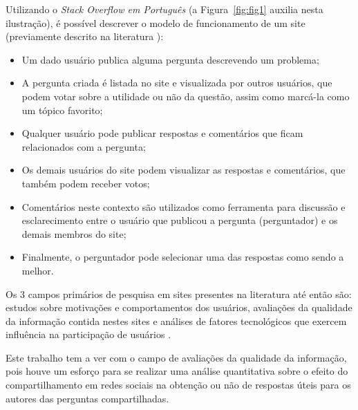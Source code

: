 Utilizando o \textit{Stack Overflow em Português} (a Figura~\ref{fig:fig1} auxilia nesta ilustração), é possível descrever o modelo de funcionamento de um site \qa (previamente descrito na literatura \cite{furtado2013contributor}):
    \begin{itemize}
        \item Um dado usuário publica alguma pergunta descrevendo um problema;
        \item A pergunta criada é listada no site e visualizada por outros usuários, que podem votar sobre a utilidade ou não da questão, assim como marcá-la como um tópico favorito;
        \item Qualquer usuário pode publicar respostas e comentários que ficam relacionados com a pergunta;
        \item Os demais usuários do site podem visualizar as respostas e comentários, que também podem receber votos;
        \item Comentários neste contexto são utilizados como ferramenta para discussão e esclarecimento entre o usuário que publicou a pergunta (perguntador) e os demais membros do site;
        \item Finalmente, o perguntador pode selecionar uma das respostas como sendo a melhor.
    \end{itemize}
    
Os 3 campos primários de pesquisa em sites \qa presentes na literatura até então são: estudos sobre motivações e comportamentos dos usuários, avaliações da qualidade da informação contida nestes sites e análises de fatores tecnológicos que exercem influência na participação de usuários \cite{shah2009research}.

Este trabalho tem a ver com o campo de avaliações da qualidade da informação, pois houve um esforço para se realizar uma análise quantitativa sobre o efeito do compartilhamento em redes sociais na obtenção ou não de respostas úteis para os autores das perguntas compartilhadas.

